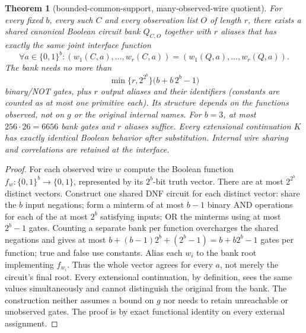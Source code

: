 \documentclass[11pt]{article}
\newtheorem{theorem}{Theorem}
\begin{document}
\begin{theorem}[bounded-common-support, many-observed-wire quotient]\label{th:bank}
For every fixed $b$, every such $C$ and every observation list $O$ of length $r$, there exists a shared canonical Boolean circuit bank $Q_{C,O}$ together with $r$ aliases that has exactly the same joint interface function
\[
 \forall a\in\{0,1\}^{b}:
 (w_1(C,a),\ldots,w_r(C,a))
 =
 (w_1(Q,a),\ldots,w_r(Q,a)).
\]
The bank needs no more than
\[
  \min\{r,2^{2^b}\}\bigl(b+b\,2^b-1\bigr)
\]
binary/NOT gates, plus $r$ output aliases and their identifiers (constants are counted as at most one primitive each). Its structure depends on the \emph{functions observed}, not on $g$ or the original internal names. For $b=3$, at most $256\cdot26=6656$ bank gates and $r$ aliases suffice. Every extensional continuation $K$ has exactly identical Boolean behavior after substitution. Internal wire sharing and correlations are retained at the interface.
\end{theorem}
\begin{proof}
For each observed wire $w$ compute the Boolean function $f_w:\{0,1\}^b\to\{0,1\}$, represented by its $2^b$-bit truth vector. There are at most $2^{2^b}$ distinct vectors. Construct one shared DNF circuit for each distinct vector: share the $b$ input negations; form a minterm of at most $b-1$ binary AND operations for each of the at most $2^b$ satisfying inputs; OR the minterms using at most $2^b-1$ gates. Counting a separate bank per function overcharges the shared negations and gives at most $b+(b-1)2^b+(2^b-1)=b+b2^b-1$ gates per function; true and false use constants. Alias each $w_i$ to the bank root implementing $f_{w_i}$. Thus the whole vector agrees for every $a$, not merely the circuit's final root. Every extensional continuation, by definition, sees the same values simultaneously and cannot distinguish the original from the bank. The construction neither assumes a bound on $g$ nor needs to retain unreachable or unobserved gates. The proof is by exact functional identity on every external assignment.
\end{proof}
\end{document}
